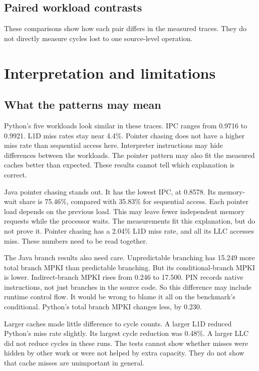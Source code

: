 \documentclass[11pt]{article}
\begin{document}



\subsection{Paired workload contrasts}
These comparisons show how each pair differs in the measured traces. They do
not directly measure cycles lost to one source-level operation.


\section{Interpretation and limitations}
\subsection{What the patterns may mean}
Python's five workloads look similar in these traces. IPC ranges from 0.9716
to 0.9921. L1D miss rates stay near 4.4\%. Pointer chasing does not have a
higher miss rate than sequential access here. Interpreter instructions may
hide differences between the workloads. The pointer pattern may also fit the
measured caches better than expected. These results cannot tell which
explanation is correct.

Java pointer chasing stands out. It has the lowest IPC, at 0.8578. Its
memory-wait share is 75.46\%, compared with 35.83\% for sequential access.
Each pointer load depends on the previous load. This may leave fewer
independent memory requests while the processor waits. The measurements fit
this explanation, but do not prove it. Pointer chasing has a 2.04\% L1D miss
rate, and all its LLC accesses miss. These numbers need to be read together.

The Java branch results also need care. Unpredictable branching has 15.249
more total branch MPKI than predictable branching. But its conditional-branch
MPKI is lower. Indirect-branch MPKI rises from 0.246 to 17.500. PIN records
native instructions, not just branches in the source code. So this difference
may include runtime control flow. It would be wrong to blame it all on the
benchmark's conditional. Python's total branch MPKI changes less, by 0.230.

Larger caches made little difference to cycle counts. A larger L1D reduced
Python's miss rate slightly. Its largest cycle reduction was 0.48\%. A larger
LLC did not reduce cycles in these runs. The tests cannot show whether misses
were hidden by other work or were not helped by extra capacity. They do not
show that cache misses are unimportant in general.
\end{document}
